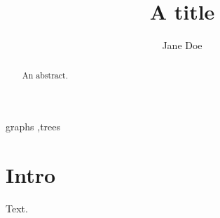 \documentclass{cas-sc}
\begin{document}
\title [mode = title]{A title}
\author[1]{Jane Doe}
\begin{abstract}
An abstract.
\end{abstract}
\begin{keywords}
graphs \sep trees
\end{keywords}
\maketitle
\section{Intro}
Text.
\end{document}
